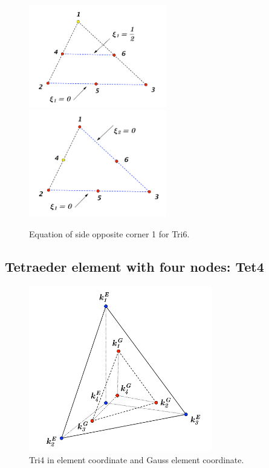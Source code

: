 \documentclass{article}
\begin{document}
\begin{figure}[h]
	\begin{center}
		\includegraphics[width=6cm,clip]{Tri6_2.pdf}		
		\includegraphics[width=6cm,clip]{Tri6_3.pdf}		
		\caption{Equation of side opposite corner 1 for Tri6.} \label{fig: Tri6_2}
		
	\end{center} 
\end{figure}


\subsection{Tetraeder element with four nodes: Tet4}

\begin{figure}[h]
	\begin{center}
		\includegraphics[width=8cm,clip]{Tet4_1.pdf}			
		\caption{Tri4 in element coordinate and Gauss element coordinate.}
	\end{center} 
\end{figure}
\end{document}
